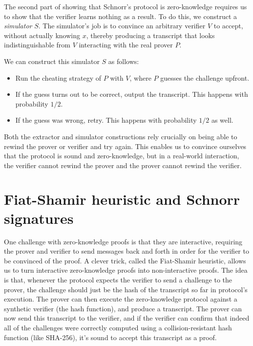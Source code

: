 The second part of showing that Schnorr's protocol is zero-knowledge
requires us to show that the verifier learns nothing as a result.
To do this, we construct a \emph{simulator} $S$.  The simulator's job
is to convince an arbitrary verifier $V$ to accept, without actually
knowing $x$, thereby producing a transcript that looks indistinguishable
from $V$ interacting with the real prover $P$.

We can construct this simulator $S$ as follows:

\begin{itemize}

\item Run the cheating strategy of $P$ with $V$, where $P$ guesses
  the challenge upfront.

\item If the guess turns out to be correct, output the transcript.
  This happens with probability $1/2$.

\item If the guess was wrong, retry.  This happens with probability $1/2$
  as well.

\end{itemize}

Both the extractor and simulator constructions rely crucially on being
able to rewind the prover or verifier and try again.  This enables us
to convince ourselves that the protocol is sound and zero-knowledge,
but in a real-world interaction, the verifier cannot rewind the prover
and the prover cannot rewind the verifier.


\section{Fiat-Shamir heuristic and Schnorr signatures}

One challenge with zero-knowledge proofs is that they are interactive,
requiring the prover and verifier to send messages back and forth
in order for the verifier to be convinced of the proof.  A clever
trick, called the Fiat-Shamir heuristic, allows us to turn interactive
zero-knowledge proofs into non-interactive proofs.  The idea is that,
whenever the protocol expects the verifier to send a challenge to the
prover, the challenge should just be the hash of the transcript so far
in protocol's execution.  The prover can then execute the zero-knowledge
protocol against a synthetic verifier (the hash function), and produce
a transcript.  The prover can now send this transcript to the verifier,
and if the verifier can confirm that indeed all of the challenges were
correctly computed using a collision-resistant hash function (like
SHA-256), it's sound to accept this transcript as a proof.

